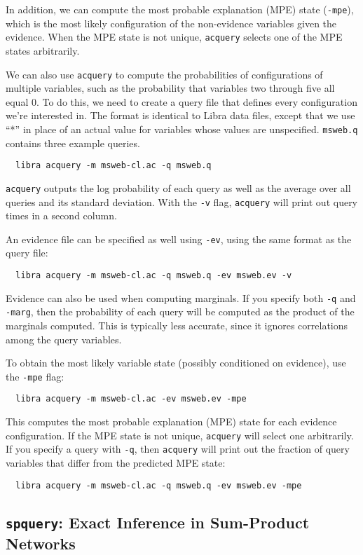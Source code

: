 \documentclass[11pt]{article}
\begin{document}
In addition, we can compute the most probable explanation (MPE) state
({\tt -mpe}), which is the most likely configuration of the
non-evidence variables given the evidence.  When the MPE state is not
unique, {\tt acquery} selects one of the MPE states arbitrarily.

We can also use {\tt acquery} to compute the probabilities of
configurations of multiple variables, such as the probability that
variables two through five all equal 0.  To do this, we need to create
a query file that defines every configuration we're interested in.
The format is identical to Libra data files, except that we use ``*''
in place of an actual value for variables whose values are
unspecified.  {\tt msweb.q} contains three example queries.
\begin{verbatim}
  libra acquery -m msweb-cl.ac -q msweb.q
\end{verbatim}
{\tt acquery} outputs the log probability of each query as
well as the average over all queries and its standard deviation.
With the {\tt -v} flag, {\tt acquery} will print out query times in
a second column.

An evidence file can be specified as well using {\tt -ev}, using the
same format as the query file:
\begin{verbatim}
  libra acquery -m msweb-cl.ac -q msweb.q -ev msweb.ev -v
\end{verbatim}

Evidence can also be used when computing marginals.  If you specify
both {\tt -q} and {\tt -marg}, then the probability of each query will be
computed as the product of the marginals computed.  This is typically
less accurate, since it ignores correlations among the query variables.

To obtain the most likely variable state (possibly conditioned on
evidence), use the {\tt -mpe} flag:
\begin{verbatim}
  libra acquery -m msweb-cl.ac -ev msweb.ev -mpe
\end{verbatim}
This computes the most probable explanation (MPE) state for each
evidence configuration.  If the MPE state is not unique, {\tt acquery}
will select one arbitrarily.  If you specify a query with {\tt -q},
then {\tt acquery} will print out the fraction of query variables that
differ from the predicted MPE state:
\begin{verbatim}
  libra acquery -m msweb-cl.ac -q msweb.q -ev msweb.ev -mpe
\end{verbatim}

\subsection{{\tt spquery}: Exact Inference in Sum-Product Networks} \label{sec:spquery}
\end{document}

